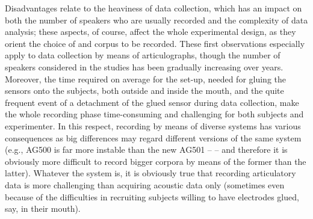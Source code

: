 \documentclass[output=paper]{langsci/langscibook}
\begin{document}
Disadvantages relate to the heaviness of data collection, which has an impact on both the number of speakers who are usually recorded and the complexity of data analysis; these aspects, of course, affect the whole experimental design, as they orient the choice of  and corpus to be recorded. These first observations especially apply to data collection by means of articulographs, though the number of speakers considered in the studies has been gradually increasing over years. Moreover, the time required on average for the set-up, needed for gluing the sensors onto the subjects, both outside and inside the mouth, and the quite frequent event of a detachment of the glued sensor during data collection, make the whole recording phase time-consuming and challenging for both subjects and experimenter. In this respect, recording by means of diverse systems has various consequences as big differences may regard different versions of the same system (e.g., AG500 is far more instable than the new AG501 -- \citealt{Stella2012,Stella2013} -- and therefore it is obviously more difficult to record bigger corpora by means of the former than the latter). Whatever the system is, it is obviously true that recording articulatory data is more challenging than acquiring acoustic data only (sometimes even because of the difficulties in recruiting subjects willing to have electrodes glued, say, in their mouth).\largerpage
\end{document}
